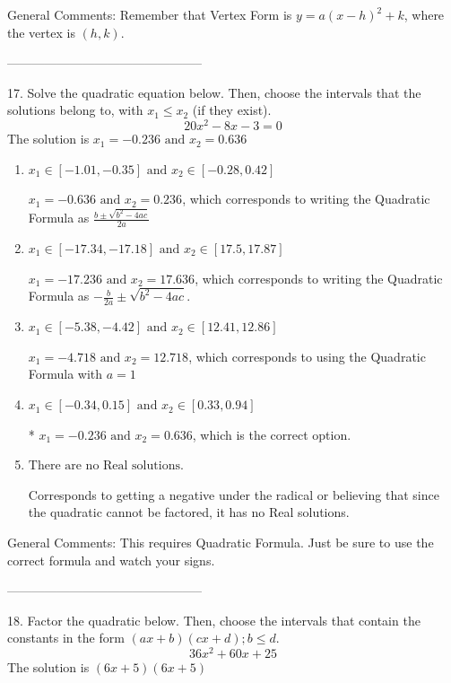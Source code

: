 \documentclass{extbook}[14pt]
\begin{document}
General Comments: Remember that Vertex Form is $y = a(x-h)^2+k$, where the vertex is $(h, k)$.

-----------------------------------------------

17. Solve the quadratic equation below. Then, choose the intervals that the solutions belong to, with $x_1 \leq x_2$ (if they exist).
\[ 20x^{2} -8 x -3 = 0 \] 
The solution is $ x_1 = -0.236 \text{ and } x_2 = 0.636 $ 

\begin{enumerate}[label=\Alph*.] 
\item $ x_1 \in [-1.01, -0.35] \text{ and } x_2 \in [-0.28, 0.42] $ 

  $x_1 = -0.636 \text{ and } x_2 = 0.236$, which corresponds to writing the Quadratic Formula as $\frac{b \pm \sqrt{b^2 - 4ac}}{2a}$ 
\item $ x_1 \in [-17.34, -17.18] \text{ and } x_2 \in [17.5, 17.87] $ 

  $x_1 = -17.236 \text{ and } x_2 = 17.636$, which corresponds to writing the Quadratic Formula as $-\frac{b}{2a} \pm \sqrt{b^2 - 4ac}$. 
\item $ x_1 \in [-5.38, -4.42] \text{ and } x_2 \in [12.41, 12.86] $ 

  $x_1 = -4.718 \text{ and } x_2 = 12.718$, which corresponds to using the Quadratic Formula with $a=1$ 
\item $ x_1 \in [-0.34, 0.15] \text{ and } x_2 \in [0.33, 0.94] $ 

 * $x_1 = -0.236 \text{ and } x_2 = 0.636$, which is the correct option. 
\item $ \text{There are no Real solutions.} $ 

 Corresponds to getting a negative under the radical or believing that since the quadratic cannot be factored, it has no Real solutions. 
\end{enumerate} 
 
General Comments: This requires Quadratic Formula. Just be sure to use the correct formula and watch your signs.

-----------------------------------------------

18. Factor the quadratic below. Then, choose the intervals that contain the constants in the form $(ax+b)(cx+d); b \leq d.$
\[ 36x^{2} +60 x + 25 \] 
The solution is $ (6x + 5)(6x + 5) $ 
\end{document}
